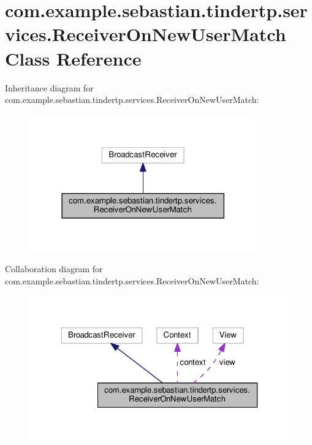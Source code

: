 \hypertarget{classcom_1_1example_1_1sebastian_1_1tindertp_1_1services_1_1ReceiverOnNewUserMatch}{}\section{com.\+example.\+sebastian.\+tindertp.\+services.\+Receiver\+On\+New\+User\+Match Class Reference}
\label{classcom_1_1example_1_1sebastian_1_1tindertp_1_1services_1_1ReceiverOnNewUserMatch}


Inheritance diagram for com.\+example.\+sebastian.\+tindertp.\+services.\+Receiver\+On\+New\+User\+Match\+:\nopagebreak
\begin{figure}[H]
\begin{center}
\leavevmode
\includegraphics[width=278pt]{classcom_1_1example_1_1sebastian_1_1tindertp_1_1services_1_1ReceiverOnNewUserMatch__inherit__graph}
\end{center}
\end{figure}


Collaboration diagram for com.\+example.\+sebastian.\+tindertp.\+services.\+Receiver\+On\+New\+User\+Match\+:\nopagebreak
\begin{figure}[H]
\begin{center}
\leavevmode
\includegraphics[width=323pt]{classcom_1_1example_1_1sebastian_1_1tindertp_1_1services_1_1ReceiverOnNewUserMatch__coll__graph}
\end{center}
\end{figure}
